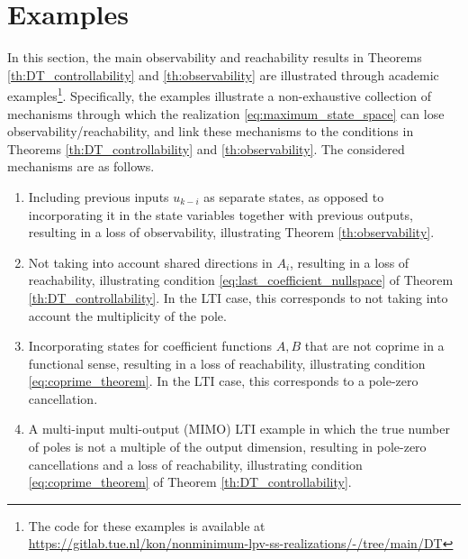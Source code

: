 \section{Examples}
\label{sec:examples}
In this section, the main observability and reachability results in Theorems \ref{th:DT_controllability} and \ref{th:observability} are illustrated through academic examples\footnote{The code for these examples is available at \protect\url{https://gitlab.tue.nl/kon/nonminimum-lpv-ss-realizations/-/tree/main/DT}}. Specifically, the examples illustrate a non-exhaustive collection of mechanisms through which the realization \eqref{eq:maximum_state_space} can lose observability/reachability, and link these mechanisms to the conditions in Theorems \ref{th:DT_controllability} and \ref{th:observability}. The considered mechanisms are as follows.
\begin{enumerate}[noitemsep]
    \item Including previous inputs $u_{k-i}$ as separate states, as opposed to incorporating it in the state variables together with previous outputs, resulting in a loss of observability, illustrating Theorem \ref{th:observability}.
    \item Not taking into account shared directions in $A_i$, resulting in a loss of reachability, illustrating condition \eqref{eq:last_coefficient_nullspace} of Theorem \ref{th:DT_controllability}. In the LTI case, this corresponds to not taking into account the multiplicity of the pole.
    \item Incorporating states for coefficient functions $A,B$ that are not coprime in a functional sense, resulting in a loss of reachability, illustrating condition \eqref{eq:coprime_theorem}. In the LTI case, this corresponds to a pole-zero cancellation.
    \item A multi-input multi-output (MIMO) LTI example in which the true number of poles is not a multiple of the output dimension, resulting in pole-zero cancellations and a loss of reachability, illustrating condition \eqref{eq:coprime_theorem} of Theorem \ref{th:DT_controllability}.
\end{enumerate}

